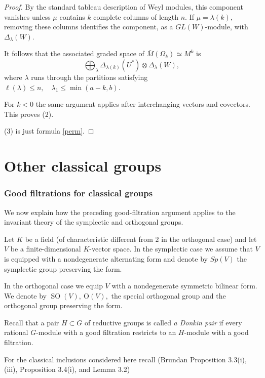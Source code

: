 \documentclass[10pt]{amsart}
\theoremstyle{definition}
\theoremstyle{remark}
\newcommand{\SO}{\operatorname{SO}}
\begin{document}
\begin{proof}
By the standard tableau description of Weyl
modules, this component vanishes unless
$\mu$ contains $k$ complete columns of length $n$.
If $\mu=\lambda(k)$, removing these columns
identifies the component, as a $GL(W)$-module,
with $\Delta_\lambda(W)$.

It follows that the associated graded space
of $\bar M(\Omega_k)\simeq  M^k $ is
\[
\bigoplus_\lambda
\Delta_{\lambda(k)}(U^*)\otimes
\Delta_\lambda(W),
\]
where $\lambda$ runs through the partitions
satisfying \ 
\(
\ell(\lambda)\leq n,\quad
\lambda_1\leq\min(a-k,b).
\)
\smallskip

For $k<0$ the same argument applies after
interchanging vectors and covectors. This proves (2).




\medskip

(3)  is just  formula  \eqref{perm}.

 \end{proof}
\part{Other classical groups}

\section{Good filtrations for classical groups}\label{sec:orthogonal-symplectic-positive-characteristic}
We now explain how the preceding good-filtration argument applies to the invariant theory of 
the symplectic and orthogonal groups.\smallskip



Let \(K\) be a field (of characteristic different from \(2\) in the orthogonal case) and let \(V\) be a finite-dimensional
\(K\)-vector space.  In the symplectic case we assume that \(V\) is
equipped with a nondegenerate alternating form and denote by
$Sp(V)$ the symplectic group preserving the form.\medskip

In the orthogonal case we equip \(V\) with a nondegenerate symmetric bilinear form. We denote by
$
 \SO(V),\   \mathrm O(V),
$ the special orthogonal group  and the orthogonal group  preserving the form.\medskip




Recall that a pair \(H\subset G\) of reductive
groups is called {\em a Donkin pair} if every rational \(G\)-module with a
good filtration restricts to an \(H\)-module with
a good filtration.

For the classical inclusions considered here recall (Brundan \cite{brundan} Proposition 3.3(i), (iii), Proposition 3.4(i), and Lemma 3.2)
\end{document}
